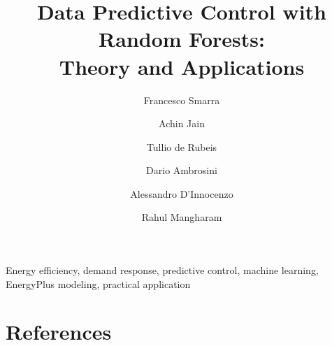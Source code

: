 \documentclass[review]{elsarticle}
\begin{document}
\begin{frontmatter}

\title{Data Predictive Control with Random Forests:\\Theory and Applications}

\author[FSaddress,EC]{Francesco Smarra}

\author[AJaddress,EC]{Achin Jain}
\author[TDRaddress,EC]{Tullio de Rubeis}
\author[TDRaddress]{Dario Ambrosini}
\author[FSaddress]{Alessandro D'Innocenzo}
\author[AJaddress]{Rahul Mangharam}


\address[FSaddress]{Department of Information Engineering, Computer Science and Mathematics, Universit\`{a} degli Studi dell'Aquila, L'Aquila, Italy}
\address[AJaddress]{Department of Electrical and Systems Engineering, University of Pennsylvania, Philadelphia, USA}
\address[TDRaddress]{Department of Industrial and Information Engineering and Economics, Universit\`{a} degli Studi dell'Aquila, L'Aquila, Italy}


\begin{abstract}

\end{abstract}

\begin{keyword}
Energy efficiency, demand response, predictive control, machine learning, EnergyPlus modeling, practical application
\end{keyword}

\end{frontmatter}
















\section*{References}


\end{document}

